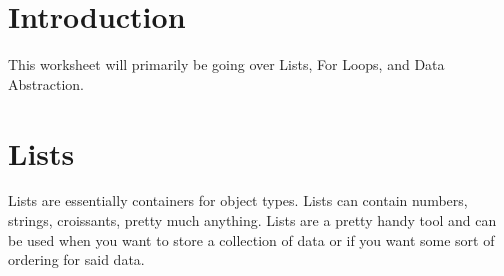 \documentclass{article}
\begin{document}
\maketitle
\section{Introduction}
This worksheet will primarily be going over Lists, For Loops, and Data Abstraction. 
\section{Lists}
Lists are essentially containers for object types. Lists can contain numbers, strings, croissants, pretty much anything. Lists are a pretty handy tool and can be used when you want to store a collection of data or if you want some sort of ordering for said data. 
\end{document}

